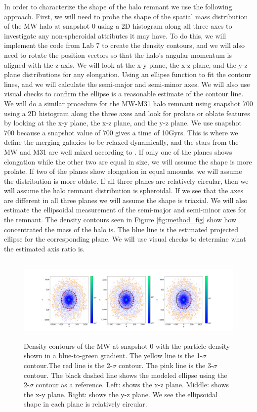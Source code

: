 \documentclass[linenumbers, twocolumn]{aastex631}
\begin{document}
In order to characterize the shape of the halo remnant we use the following approach.
First, we will need to probe the shape of the spatial mass distribution of the MW halo at snapshot 0 using a 2D histogram along all three axes to investigate any non-spheroidal attributes it may have. To do this, we will implement the code from Lab 7 to create the density contours, and we will also need to rotate the position vectors so that the halo's angular momentum is aligned with the z-axis. We will look at the x-y plane, the x-z plane, and the y-z plane distributions for any elongation. Using an ellipse function to fit the contour lines, and we will calculate the semi-major and semi-minor axes. We will also use visual checks to confirm the ellipse is a reasonable  estimate of the contour line.
We will do a similar procedure for the MW-M31 halo remnant using snapshot 700 using a 2D histogram along the three axes and look for prolate or oblate features by looking at the x-y plane, the x-z plane, and the y-z plane. We use snapshot 700 because a snapshot value of 700 gives a time of 10Gyrs. This is where we define the merging galaxies to be relaxed dynamically, and the stars from the MW and M31 are well mixed according to \cite{2012VanDerMarel}. If only one of the planes shows elongation while the other two are equal in size, we will assume the shape is more prolate. If two of the planes show elongation in equal amounts, we will assume the distribution is more oblate. If all three planes are relatively circular, then we will assume the halo remnant distribution is spheroidal. If we see that the axes are different in all three planes we will assume the shape is triaxial. We will also estimate the ellipsoidal measurement of the semi-major and semi-minor axes for the remnant.
The density contours seen in Figure \ref{fig:method_fig} show how concentrated the mass of the halo is. The blue line is the estimated projected ellipse for the corresponding plane. We will use visual checks to determine what the estimated axis ratio is.

\begin{figure}
    \centering
    \includegraphics[width=\textwidth,height=4.2cm]{figures/MW_M31_000_3subplots_Density.png}
    \caption{Density contours of the MW at snapshot 0 with the particle density shown in a blue-to-green gradient. The yellow line is the 1-$\sigma$ contour.The red line is the 2-$\sigma$ contour. The pink line is the 3-$\sigma$ contour. The black dashed line shows the modeled ellipse using the 2-$\sigma$ contour as a reference. Left: shows the x-z plane. Middle: shows the x-y plane. Right: shows the y-z plane. We see the ellipsoidal shape in each plane is relatively circular.}
    \label{fig:MW_contour_0}
\end{figure}
\end{document}
